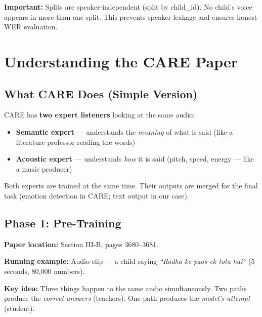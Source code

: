 \documentclass[12pt, a4paper]{article}
\begin{document}
\begin{notebox}
\textbf{Important:} Splits are speaker-independent (split by child\_id).
No child's voice appears in more than one split. This prevents speaker
leakage and ensures honest WER evaluation.
\end{notebox}

\section{Understanding the CARE Paper}

\subsection{What CARE Does (Simple Version)}

CARE has \textbf{two expert listeners} looking at the same audio:
\begin{itemize}[leftmargin=*]
  \item \textbf{Semantic expert} --- understands the \textit{meaning}
        of what is said (like a literature professor reading the words)
  \item \textbf{Acoustic expert} --- understands \textit{how} it is
        said (pitch, speed, energy --- like a music producer)
\end{itemize}

Both experts are trained at the same time. Their outputs are merged
for the final task (emotion detection in CARE; text output in our case).

\subsection{Phase 1: Pre-Training}

\textbf{Paper location:} Section III-B, pages 3680--3681.

\medskip
\textbf{Running example:} Audio clip --- a child saying
\textit{``Radha ke paas ek tota hai''} (5 seconds, 80,000 numbers).

\medskip
\textbf{Key idea:} Three things happen to the same audio
simultaneously. Two paths produce the \textit{correct answers}
(teachers). One path produces the \textit{model's attempt} (student).
\end{document}
